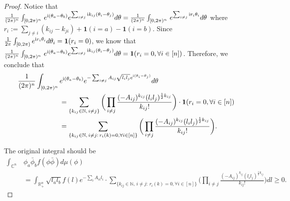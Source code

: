 \documentclass[a4paper, 11pt]{article}
\newcommand{\ind}{\mathbf{1}}
\newcommand{\compi}{\textnormal{i}}
\begin{document}
\begin{proof}
Notice that $\frac{1}{(2\pi)^n}\int_{[0,2\pi)^n}\, e^{\compi(\theta_a-\theta_b)}e^{\sum_{i\neq j}\compi k_{ij}(\theta_i-\theta_j)} d\theta=\frac{1}{(2\pi)^n}\int_{[0,2\pi)^n}\, e^{\sum_{i\neq j}\compi r_i\theta_i} d\theta$ where $r_i:=\sum_{j\neq i} (k_{ij}- k_{ji})+\ind(i=a)-\ind(i=b)$. Since $\frac{1}{2\pi}\int_{[0,2\pi)}e^{\compi r_i\theta_i}d\theta_i=\ind(r_i=0)$, we know that $\frac{1}{(2\pi)^n}\int_{[0,2\pi)^n}\, e^{\compi(\theta_a-\theta_b)}e^{\sum_{i\neq j}\compi k_{ij}(\theta_i-\theta_j)} d\theta=\ind(r_i=0,\forall i\in[n])$. Therefore, we conclude that
    \begin{align*}
    \frac{1}{(2\pi)^n}\int_{[0,2\pi)^n}\, & e^{\compi(\theta_a-\theta_b)}   e^{-\sum_{i\neq j} A_{ij}\sqrt{l_i l_j}e^{\compi(\theta_i-\theta_j)}} d\theta \\
    &= \sum_{\{k_{ij}\in\mathbb{N}, \,i\neq j\}}\bigg(\prod_{i\neq j} \frac{(- A_{ij})^{k_{ij}}(l_i l_j)^{\frac{1}{2}k_{ij}}}{k_{ij}!}\bigg)\cdot \ind(r_i=0,\forall i\in[n])\\
    &= \sum_{\{k_{ij}\in\mathbb{N},\,i\neq j:\, r_i(k)=0,\forall i\in[n]\}}\bigg(\prod_{i\neq j} \frac{(- A_{ij})^{k_{ij}}(l_i l_j)^{\frac{1}{2}k_{ij}}}{k_{ij}!}\bigg).
    \end{align*}

The original integral should be
    \begin{align*}
    \int_{\mathbb{C}^n}\, & \phi_a\bar{\phi}_b f(\phi\bar{\phi}) d\mu(\phi) \\
    & = \int_{\mathbb{R}_+^n}\sqrt{l_a l_b} f(l) e^{-\sum_{i} A_{ii}l_i} \cdot \sum_{\{k_{ij}\in\mathbb{N},\,i\neq j:\, r_i(k)=0,\forall i\in[n]\}}\bigg(\prod_{i\neq j} \frac{(- A_{ij})^{k_{ij}}(l_i l_j)^{\frac{1}{2}k_{ij}}}{k_{ij}!}\bigg) dl\geq 0.
    \end{align*}


\end{proof}
\end{document}
